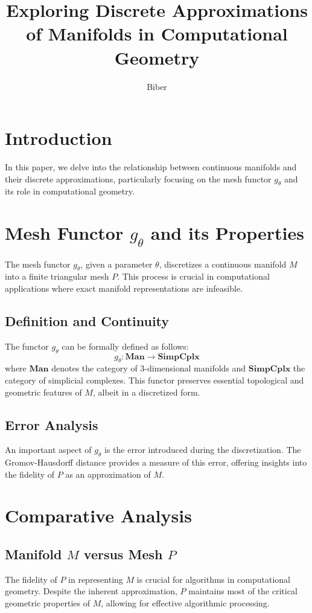 \documentclass{article}
\title{Exploring Discrete Approximations of Manifolds in Computational Geometry}
\author{Biber}
\date{}
\begin{document}
\maketitle

\section{Introduction}
In this paper, we delve into the relationship between continuous manifolds and their discrete approximations, particularly focusing on the mesh functor \( g_\theta \) and its role in computational geometry.

\section{Mesh Functor \( g_\theta \) and its Properties}
The mesh functor \( g_\theta \), given a parameter \( \theta \), discretizes a continuous manifold \( M \) into a finite triangular mesh \( P \). This process is crucial in computational applications where exact manifold representations are infeasible. 

\subsection{Definition and Continuity}
The functor \( g_\theta \) can be formally defined as follows:
\[ g_\theta : \mathbf{Man} \rightarrow \mathbf{SimpCplx} \]
where \( \mathbf{Man} \) denotes the category of 3-dimensional manifolds and \( \mathbf{SimpCplx} \) the category of simplicial complexes. This functor preserves essential topological and geometric features of \( M \), albeit in a discretized form.

\subsection{Error Analysis}
An important aspect of \( g_\theta \) is the error introduced during the discretization. The Gromov-Hausdorff distance provides a measure of this error, offering insights into the fidelity of \( P \) as an approximation of \( M \).

\section{Comparative Analysis}
\subsection{Manifold \( M \) versus Mesh \( P \)}
The fidelity of \( P \) in representing \( M \) is crucial for algorithms in computational geometry. Despite the inherent approximation, \( P \) maintains most of the critical geometric properties of \( M \), allowing for effective algorithmic processing.
\end{document}
